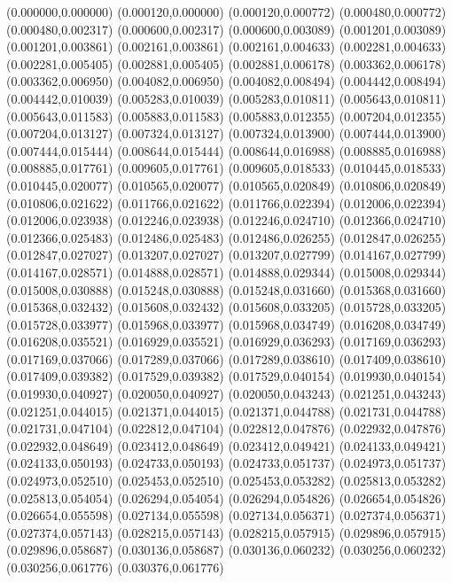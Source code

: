 (0.000000,0.000000)
(0.000120,0.000000)
(0.000120,0.000772)
(0.000480,0.000772)
(0.000480,0.002317)
(0.000600,0.002317)
(0.000600,0.003089)
(0.001201,0.003089)
(0.001201,0.003861)
(0.002161,0.003861)
(0.002161,0.004633)
(0.002281,0.004633)
(0.002281,0.005405)
(0.002881,0.005405)
(0.002881,0.006178)
(0.003362,0.006178)
(0.003362,0.006950)
(0.004082,0.006950)
(0.004082,0.008494)
(0.004442,0.008494)
(0.004442,0.010039)
(0.005283,0.010039)
(0.005283,0.010811)
(0.005643,0.010811)
(0.005643,0.011583)
(0.005883,0.011583)
(0.005883,0.012355)
(0.007204,0.012355)
(0.007204,0.013127)
(0.007324,0.013127)
(0.007324,0.013900)
(0.007444,0.013900)
(0.007444,0.015444)
(0.008644,0.015444)
(0.008644,0.016988)
(0.008885,0.016988)
(0.008885,0.017761)
(0.009605,0.017761)
(0.009605,0.018533)
(0.010445,0.018533)
(0.010445,0.020077)
(0.010565,0.020077)
(0.010565,0.020849)
(0.010806,0.020849)
(0.010806,0.021622)
(0.011766,0.021622)
(0.011766,0.022394)
(0.012006,0.022394)
(0.012006,0.023938)
(0.012246,0.023938)
(0.012246,0.024710)
(0.012366,0.024710)
(0.012366,0.025483)
(0.012486,0.025483)
(0.012486,0.026255)
(0.012847,0.026255)
(0.012847,0.027027)
(0.013207,0.027027)
(0.013207,0.027799)
(0.014167,0.027799)
(0.014167,0.028571)
(0.014888,0.028571)
(0.014888,0.029344)
(0.015008,0.029344)
(0.015008,0.030888)
(0.015248,0.030888)
(0.015248,0.031660)
(0.015368,0.031660)
(0.015368,0.032432)
(0.015608,0.032432)
(0.015608,0.033205)
(0.015728,0.033205)
(0.015728,0.033977)
(0.015968,0.033977)
(0.015968,0.034749)
(0.016208,0.034749)
(0.016208,0.035521)
(0.016929,0.035521)
(0.016929,0.036293)
(0.017169,0.036293)
(0.017169,0.037066)
(0.017289,0.037066)
(0.017289,0.038610)
(0.017409,0.038610)
(0.017409,0.039382)
(0.017529,0.039382)
(0.017529,0.040154)
(0.019930,0.040154)
(0.019930,0.040927)
(0.020050,0.040927)
(0.020050,0.043243)
(0.021251,0.043243)
(0.021251,0.044015)
(0.021371,0.044015)
(0.021371,0.044788)
(0.021731,0.044788)
(0.021731,0.047104)
(0.022812,0.047104)
(0.022812,0.047876)
(0.022932,0.047876)
(0.022932,0.048649)
(0.023412,0.048649)
(0.023412,0.049421)
(0.024133,0.049421)
(0.024133,0.050193)
(0.024733,0.050193)
(0.024733,0.051737)
(0.024973,0.051737)
(0.024973,0.052510)
(0.025453,0.052510)
(0.025453,0.053282)
(0.025813,0.053282)
(0.025813,0.054054)
(0.026294,0.054054)
(0.026294,0.054826)
(0.026654,0.054826)
(0.026654,0.055598)
(0.027134,0.055598)
(0.027134,0.056371)
(0.027374,0.056371)
(0.027374,0.057143)
(0.028215,0.057143)
(0.028215,0.057915)
(0.029896,0.057915)
(0.029896,0.058687)
(0.030136,0.058687)
(0.030136,0.060232)
(0.030256,0.060232)
(0.030256,0.061776)
(0.030376,0.061776)
